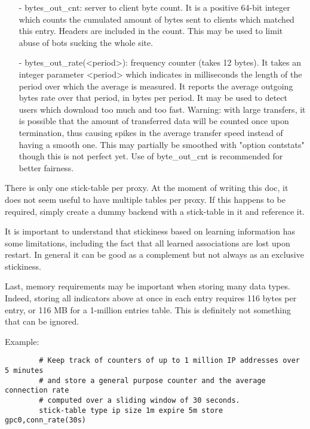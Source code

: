 \begin{itemize}
  \item[-] bytes\_out\_cnt: server to client byte count. It is a positive 64-bit
      integer which counts the cumulated amount of bytes sent to clients which
      matched this entry. Headers are included in the count. This may be used
      to limit abuse of bots sucking the whole site.

  \item[-] bytes\_out\_rate(<period>): frequency counter (takes 12 bytes). It takes
      an integer parameter <period> which indicates in milliseconds the length
      of the period over which the average is measured. It reports the average
      outgoing bytes rate over that period, in bytes per period. It may be used
      to detect users which download too much and too fast. Warning: with large
      transfers, it is possible that the amount of transferred data will be
      counted once upon termination, thus causing spikes in the average
      transfer speed instead of having a smooth one. This may partially be
      smoothed with "option contstats" though this is not perfect yet. Use of
      byte\_out\_cnt is recommended for better fairness.
  \end{itemize}

  There is only one stick-table per proxy. At the moment of writing this doc,
  it does not seem useful to have multiple tables per proxy. If this happens
  to be required, simply create a dummy backend with a stick-table in it and
  reference it.

  It is important to understand that stickiness based on learning information
  has some limitations, including the fact that all learned associations are
  lost upon restart. In general it can be good as a complement but not always
  as an exclusive stickiness.

  Last, memory requirements may be important when storing many data types.
  Indeed, storing all indicators above at once in each entry requires 116 bytes
  per entry, or 116 MB for a 1-million entries table. This is definitely not
  something that can be ignored.

  Example:
  \begin{verbatim}
        # Keep track of counters of up to 1 million IP addresses over 5 minutes
        # and store a general purpose counter and the average connection rate
        # computed over a sliding window of 30 seconds.
        stick-table type ip size 1m expire 5m store gpc0,conn_rate(30s)
  \end{verbatim}


